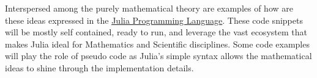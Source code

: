 Interspersed among the purely mathematical theory are examples of how 
are these ideas expressed in the \href{https://julialang.org/}{Julia 
Programming Language}. These code snippets will be mostly self 
contained, ready to run, and leverage the vast ecosystem that makes 
Julia ideal for Mathematics and Scientific disciplines. Some code 
examples will play the role of pseudo code as Julia's simple syntax 
allows the mathematical ideas to shine through the implementation 
details.
